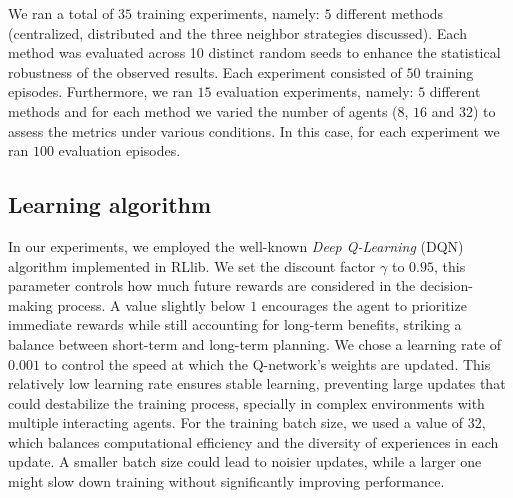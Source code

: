 \documentclass[sigconf]{acmart}
\begin{document}
We ran a total of $35$ training experiments, 
namely: $5$ different methods %
  (centralized, distributed and the three neighbor strategies discussed).
Each method was evaluated across 10 distinct random seeds to enhance the statistical robustness of the observed results.
%
Each experiment consisted of $50$ training episodes. 
%
Furthermore, we ran $15$ evaluation experiments, namely: $5$ different methods and for each method 
  we varied the number of agents ($8$, $16$ and $32$) to assess the metrics under various conditions.
  In this case, for each experiment we ran $100$ evaluation episodes.

\subsection{Learning algorithm}
In our experiments, we employed the well-known \emph{Deep Q-Learning} (DQN) algorithm implemented in RLlib.
%
We set the discount factor $\gamma$ to $0.95$, this parameter controls how much future rewards are 
  considered in the decision-making process.
%
A value slightly below $1$ encourages the agent to prioritize immediate rewards while still accounting 
  for long-term benefits, striking a balance between short-term and long-term planning.
%
We chose a learning rate of $0.001$ to control the speed at which the Q-network's weights are updated.
%
This relatively low learning rate ensures stable learning, preventing large updates that could destabilize 
  the training process, specially in complex environments with multiple interacting agents.
%
For the training batch size, we used a value of $32$, which balances computational efficiency and the diversity 
  of experiences in each update. 
%
A smaller batch size could lead to noisier updates, while a larger one might slow down training without
  significantly improving performance.
%
\end{document}
